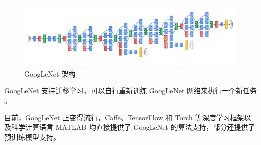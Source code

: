 \begin{figure}[h]
    \centering
    \includegraphics[width=\textwidth]{figures/arch.png}
    \caption{GoogLeNet 架构}
    \label{fig:arch}
\end{figure}

GoogLeNet 支持迁移学习，可以自行重新训练 GoogLeNet 网络来执行一个新任务 \cite{ggnet1}。

目前，GoogLeNet 正变得流行，Caffe、TensorFlow 和 Torch 等深度学习框架以及科学计算语言 MATLAB 均直接提供了 GoogLeNet 的算法支持，部分还提供了预训练模型支持。
